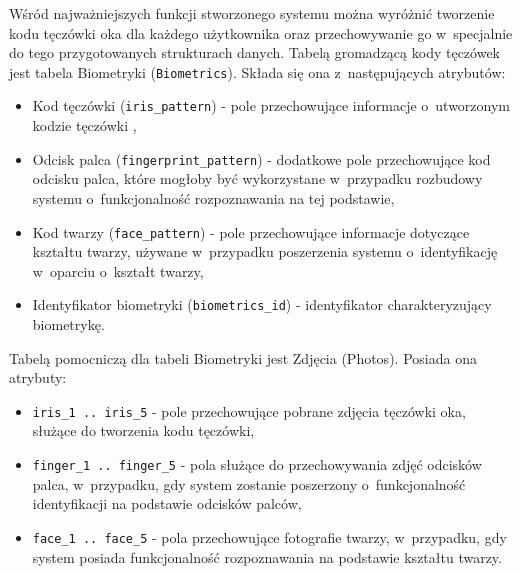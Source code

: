 Wśród najważniejszych funkcji stworzonego systemu można wyróżnić tworzenie kodu tęczówki oka dla każdego użytkownika oraz przechowywanie go w~specjalnie do tego przygotowanych strukturach danych. Tabelą gromadzącą kody tęczówek jest tabela Biometryki (\verb!Biometrics!). Składa się ona z~następujących atrybutów:
\begin{itemize}
\item Kod tęczówki (\verb!iris_pattern!) - pole przechowujące informacje o~utworzonym kodzie tęczówki ,
\item Odcisk palca (\verb!fingerprint_pattern!) - dodatkowe pole przechowujące kod odcisku palca, które mogłoby być wykorzystane w~przypadku rozbudowy systemu o~funkcjonalność rozpoznawania na tej podstawie,
\item Kod twarzy (\verb!face_pattern!) - pole przechowujące informacje dotyczące kształtu twarzy, używane w~przypadku poszerzenia systemu o~identyfikację w~oparciu o~kształt twarzy,
\item Identyfikator biometryki (\verb!biometrics_id!) - identyfikator charakteryzujący biometrykę.
\end{itemize}

Tabelą pomocniczą dla tabeli Biometryki jest Zdjęcia (Photos). Posiada ona atrybuty:
\begin{itemize}
\item \verb!iris_1 .. iris_5! - pole przechowujące pobrane zdjęcia tęczówki oka, służące do tworzenia kodu tęczówki,
\item \verb!finger_1 .. finger_5! - pola służące do przechowywania zdjęć odcisków palca, w~przypadku, gdy system zostanie poszerzony o~funkcjonalność identyfikacji na podstawie odcisków palców,
\item \verb!face_1 .. face_5! - pola przechowujące fotografie twarzy, w~przypadku, gdy system posiada funkcjonalność rozpoznawania na podstawie kształtu twarzy.
\end{itemize}

